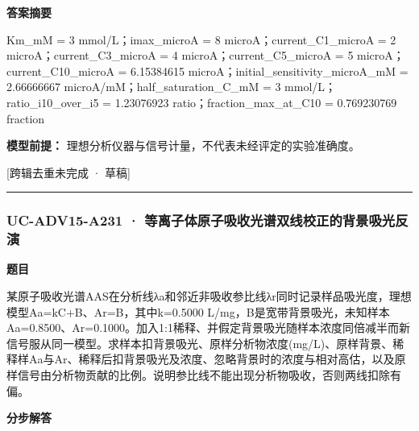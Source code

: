 \documentclass[UTF8,11pt,a4paper]{ctexart}
\begin{document}
\noindent\textbf{答案摘要}\par
Km\_mM = 3 mmol/L；imax\_microA = 8 microA；current\_C1\_microA = 2 microA；current\_C3\_microA = 4 microA；current\_C5\_microA = 5 microA；current\_C10\_microA = 6.15384615 microA；initial\_sensitivity\_microA\_mM = 2.66666667 microA/mM；half\_saturation\_C\_mM = 3 mmol/L；ratio\_i10\_over\_i5 = 1.23076923 ratio；fraction\_max\_at\_C10 = 0.769230769 fraction\par
\noindent\textbf{模型前提：}
理想分析仪器与信号计量，不代表未经评定的实验准确度。\par
\noindent\textcolor{red!65!black}{[跨辑去重未完成 · 草稿]} \par
\medskip\hrule\medskip
{}
\subsubsection*{UC-ADV15-A231 · 等离子体原子吸收光谱双线校正的背景吸光反演}
\noindent\textbf{题目}\par
某原子吸收光谱AAS在分析线λa和邻近非吸收参比线λr同时记录样品吸光度，理想模型Aa=kC+B、Ar=B，其中k=0.5000 L/mg，B是宽带背景吸光，未知样本Aa=0.8500、Ar=0.1000。加入1:1稀释、并假定背景吸光随样本浓度同倍减半而新信号服从同一模型。求样本扣背景吸光、原样分析物浓度(mg/L)、原样背景、稀释样Aa与Ar、稀释后扣背景吸光及浓度、忽略背景时的浓度与相对高估，以及原样信号由分析物贡献的比例。说明参比线不能出现分析物吸收，否则两线扣除有偏。\par
\medskip\noindent\textbf{分步解答}
\end{document}
